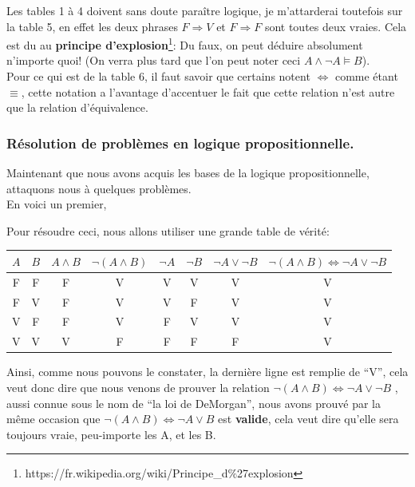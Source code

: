 \documentclass[a4paper, 12pt]{article}
\newcommand{\ffi}{\Leftrightarrow}
\newcommand{\imply}{\Rightarrow}
\numberwithin{equation}{subsection}
\begin{document}
  Les tables 1 à 4 doivent sans doute paraître logique, je m'attarderai toutefois sur la table 5, en effet les deux phrases $F \imply V$ et $F \imply F$ sont toutes deux vraies.
  Cela est du au {\bf principe d'explosion}\footnote{https://fr.wikipedia.org/wiki/Principe\_d$\%$27explosion}: Du faux, on peut déduire absolument n'importe quoi! (On verra plus tard que l'on peut noter ceci $A \land \neg A \models B$).\\
  Pour ce qui est de la table 6, il faut savoir que certains notent $\ffi$ comme étant $\equiv$, cette notation a l'avantage d'accentuer le fait que cette relation n'est autre que la relation d'équivalence.
  \subsubsection{Résolution de problèmes en logique propositionnelle.}
  Maintenant que nous avons acquis les bases de la logique propositionnelle,  attaquons nous à quelques problèmes.\\
  En voici un premier,
  \begin{center}
    \Ovalbox{$ \neg (A \land B ) \ffi \neg A \lor \neg B$}
  \end{center}
Pour résoudre ceci, nous allons utiliser une grande table de vérité: \newpage
  \begin{table}[!t]
    \centering
    \begin{tabular}{|c|c|c|c|c|c|c|c|}
      \hline $A$ & $B$ & $A \land B$ & $\neg (A \land B)$ & $\neg A$ & $\neg B$ & $\neg A \lor \neg B$ & $\neg (A \land B) \ffi \neg A \lor \neg B$ \\
      \hline  F  &  F  &      F      &          V         &     V    &     V    &          V           &                     V                      \\
              F  &  V  &      F      &          V         &     V    &     F    &          V           &                     V                      \\
              V  &  F  &      F      &          V         &     F    &     V    &          V           &                     V                      \\
              V  &  V  &      V      &          F         &     F    &     F    &          F           &                     V                      \\
      \hline
    \end{tabular}
  \end{table}
  Ainsi, comme nous pouvons le constater, la dernière ligne est remplie de ``V'', cela veut donc dire que nous venons de prouver la relation $\neg (A \land B) \ffi \neg A \lor \neg B$ , aussi connue sous le nom de ``la loi de DeMorgan'', nous avons prouvé par la même occasion que $\neg (A \land B) \ffi \neg A \lor B$ est {\bf valide}, cela veut dire qu'elle sera toujours vraie, peu-importe les A, et les B.\\[0.5cm]
\end{document}
